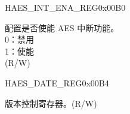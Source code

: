 \begin{register}{H}{AES\_INT\_ENA\_REG}{0x00B0}\label{regdesc:AESINTENAREG}
%
%
\regnewline%
\begin{regdesc}\begin{reglist}
\item [AES\_INT\_ENA] 配置是否使能 AES 中断功能。\\
0：禁用\\
1：使能\\
(R/W)
\end{reglist}\end{regdesc}
\end{register}


\begin{register}{H}{AES\_DATE\_REG}{0x00B4}\label{regdesc:AESDATEREG}
%
%
\regnewline%
\begin{regdesc}\begin{reglist}
\label{fielddesc:AESDATE}\item [AES\_DATE] 版本控制寄存器。(R/W)
\end{reglist}\end{regdesc}
\end{register}

